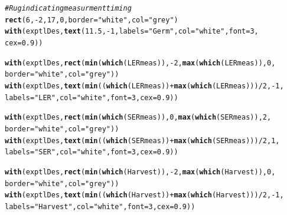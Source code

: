 \documentclass[11pt, oneside]{article}\usepackage[]{graphicx}\usepackage[]{color}
\makeatletter
\newcommand{\hlnum}[1]{\textcolor[rgb]{0.686,0.059,0.569}{#1}}%
\newcommand{\hlstr}[1]{\textcolor[rgb]{0.192,0.494,0.8}{#1}}%
\newcommand{\hlcom}[1]{\textcolor[rgb]{0.678,0.584,0.686}{\textit{#1}}}%
\newcommand{\hlopt}[1]{\textcolor[rgb]{0,0,0}{#1}}%
\newcommand{\hlstd}[1]{\textcolor[rgb]{0.345,0.345,0.345}{#1}}%
\newcommand{\hlkwc}[1]{\textcolor[rgb]{0.333,0.667,0.333}{#1}}%
\newcommand{\hlkwd}[1]{\textcolor[rgb]{0.737,0.353,0.396}{\textbf{#1}}}%
\newenvironment{kframe}{%
 \def\at@end@of@kframe{}%
 \ifinner\ifhmode%
  \def\at@end@of@kframe{\end{minipage}}%
  \begin{minipage}{\columnwidth}%
 \fi\fi%
 \def\FrameCommand##1{\hskip\@totalleftmargin \hskip-\fboxsep
 \colorbox{shadecolor}{##1}\hskip-\fboxsep
     \hskip-\linewidth \hskip-\@totalleftmargin \hskip\columnwidth}%
 \MakeFramed {\advance\hsize-\width
   \@totalleftmargin\z@ \linewidth\hsize
   \@setminipage}}%
 {\par\unskip\endMakeFramed%
 \at@end@of@kframe}
\newenvironment{knitrout}{}{} %
\makeatother
\begin{document}
\begin{knitrout}
\begin{kframe}
\begin{alltt}
\hlcom{# Rug indicating measurment timing}
\hlkwd{rect}\hlstd{(}\hlnum{6}\hlstd{,} \hlopt{-}\hlnum{2}\hlstd{,} \hlnum{17}\hlstd{,} \hlnum{0}\hlstd{,} \hlkwc{border} \hlstd{=} \hlstr{"white"}\hlstd{,} \hlkwc{col} \hlstd{=} \hlstr{"grey"}\hlstd{)}
\hlkwd{with}\hlstd{(exptlDes,} \hlkwd{text}\hlstd{(}\hlnum{11.5}\hlstd{,} \hlopt{-}\hlnum{1}\hlstd{,} \hlkwc{labels} \hlstd{=} \hlstr{"Germ"}\hlstd{,} \hlkwc{col} \hlstd{=} \hlstr{"white"}\hlstd{,} \hlkwc{font} \hlstd{=} \hlnum{3}\hlstd{,}
  \hlkwc{cex} \hlstd{=} \hlnum{0.9}\hlstd{))}

\hlkwd{with}\hlstd{(exptlDes,} \hlkwd{rect}\hlstd{(}\hlkwd{min}\hlstd{(}\hlkwd{which}\hlstd{(LERmeas)),} \hlopt{-}\hlnum{2}\hlstd{,} \hlkwd{max}\hlstd{(}\hlkwd{which}\hlstd{(LERmeas)),} \hlnum{0}\hlstd{,}
        \hlkwc{border} \hlstd{=} \hlstr{"white"}\hlstd{,} \hlkwc{col} \hlstd{=} \hlstr{"grey"}\hlstd{))}
\hlkwd{with}\hlstd{(exptlDes,} \hlkwd{text}\hlstd{(}\hlkwd{min}\hlstd{((}\hlkwd{which}\hlstd{(LERmeas))} \hlopt{+} \hlkwd{max}\hlstd{(}\hlkwd{which}\hlstd{(LERmeas)))} \hlopt{/} \hlnum{2}\hlstd{,} \hlopt{-}\hlnum{1}\hlstd{,}
        \hlkwc{labels} \hlstd{=} \hlstr{"LER"}\hlstd{,} \hlkwc{col} \hlstd{=} \hlstr{"white"}\hlstd{,} \hlkwc{font} \hlstd{=} \hlnum{3}\hlstd{,} \hlkwc{cex} \hlstd{=} \hlnum{0.9}\hlstd{))}

\hlkwd{with}\hlstd{(exptlDes,} \hlkwd{rect}\hlstd{(}\hlkwd{min}\hlstd{(}\hlkwd{which}\hlstd{(SERmeas)),} \hlnum{0}\hlstd{,} \hlkwd{max}\hlstd{(}\hlkwd{which}\hlstd{(SERmeas)),} \hlnum{2}\hlstd{,}
        \hlkwc{border} \hlstd{=} \hlstr{"white"}\hlstd{,} \hlkwc{col} \hlstd{=} \hlstr{"grey"}\hlstd{))}
\hlkwd{with}\hlstd{(exptlDes,} \hlkwd{text}\hlstd{(}\hlkwd{min}\hlstd{((}\hlkwd{which}\hlstd{(SERmeas))} \hlopt{+} \hlkwd{max}\hlstd{(}\hlkwd{which}\hlstd{(SERmeas)))} \hlopt{/} \hlnum{2}\hlstd{,} \hlnum{1}\hlstd{,}
        \hlkwc{labels} \hlstd{=} \hlstr{"SER"}\hlstd{,} \hlkwc{col} \hlstd{=} \hlstr{"white"}\hlstd{,} \hlkwc{font} \hlstd{=} \hlnum{3}\hlstd{,} \hlkwc{cex} \hlstd{=} \hlnum{0.9}\hlstd{))}

\hlkwd{with}\hlstd{(exptlDes,} \hlkwd{rect}\hlstd{(}\hlkwd{min}\hlstd{(}\hlkwd{which}\hlstd{(Harvest)),} \hlopt{-}\hlnum{2}\hlstd{,} \hlkwd{max}\hlstd{(}\hlkwd{which}\hlstd{(Harvest)),} \hlnum{0}\hlstd{,}
        \hlkwc{border} \hlstd{=} \hlstr{"white"}\hlstd{,} \hlkwc{col} \hlstd{=} \hlstr{"grey"}\hlstd{))}
\hlkwd{with}\hlstd{(exptlDes,} \hlkwd{text}\hlstd{(}\hlkwd{min}\hlstd{((}\hlkwd{which}\hlstd{(Harvest))} \hlopt{+} \hlkwd{max}\hlstd{(}\hlkwd{which}\hlstd{(Harvest)))} \hlopt{/} \hlnum{2}\hlstd{,} \hlopt{-}\hlnum{1}\hlstd{,}
        \hlkwc{labels} \hlstd{=} \hlstr{"Harvest"}\hlstd{,} \hlkwc{col} \hlstd{=} \hlstr{"white"}\hlstd{,} \hlkwc{font} \hlstd{=} \hlnum{3}\hlstd{,} \hlkwc{cex} \hlstd{=} \hlnum{0.9}\hlstd{))}


\end{alltt}
\end{kframe}
\end{knitrout}
\end{document}
